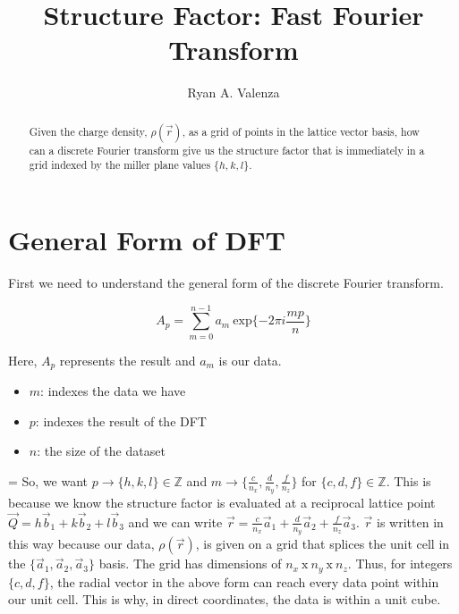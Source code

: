 \documentclass[notitlepage,letter,preprint,prb]{revtex4}
\newenvironment{anb}
		  {\par\nobreak\vfil\penalty0\vfilneg
		   \vtop\bgroup}
		  {\par\xdef\tpd{\the\prevdepth}\egroup
		   \prevdepth=\tpd}
\begin{document}
\begin{anb}
	\title{Structure Factor: Fast Fourier Transform}
	\author{Ryan A. Valenza}
\nopagebreak

\begin{abstract}
	Given the charge density, $\rho(\vec{r})$, as a grid of points in the lattice vector basis, how can a discrete Fourier transform give us the structure factor that is immediately in a grid indexed by the miller plane values $\{h,k,l\}$.
\end{abstract}
\maketitle 

\section{General Form of DFT}
	First we need to understand the general form of the discrete Fourier transform.  
	
	\begin{equation}
	A_p = \sum_{m=0}^{n-1}a_m\ \mathrm{exp}\{-2\pi i \frac{m p}{n}\}    
	\end{equation}
	
	Here, $A_p$ represents the result and $a_m$ is our data.

	\begin{itemize}
	\item $m$:  indexes the data we have
	\item $p$:  indexes the result of the DFT
	\item $n$:  the size of the dataset 
	\end{itemize}
\end{anb}
	So, we want $p\rightarrow\{h,k,l\} \in \mathbb{Z}$ and $m\rightarrow\{\frac{c}{n_x},\frac{d}{n_y},\frac{f}{n_z}\}$ for $\{c,d,f\} \in \mathbb{Z}$.  This is because we know the structure factor is evaluated at a reciprocal lattice point $\vec{Q} = h\vec{b}_1 + k\vec{b}_2 + l\vec{b}_3$ and we can write $\vec{r}=\frac{c}{n_x}\vec{a}_1+\frac{d}{n_y}\vec{a}_2+\frac{f}{n_z}\vec{a}_3$.  $\vec{r}$ is written in this way because our data, $\rho(\vec{r})$, is given on a grid that splices the unit cell in the $\{\vec{a}_1,\vec{a}_2,\vec{a}_3\}$ basis.  The grid has dimensions of $n_x\ \mathrm{x}\ n_y\ \mathrm{x}\ n_z$.  Thus, for integers $\{c,d,f\}$, the radial vector in the above form can reach every data point within our unit cell.  This is why, in direct coordinates, the data is within a unit cube.  
	
\end{document}
